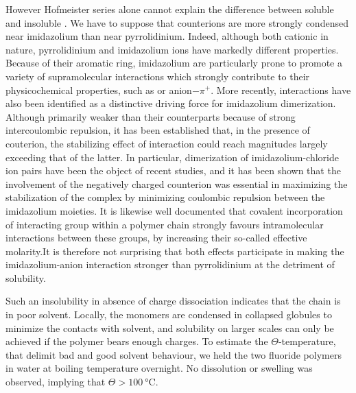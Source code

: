 \documentclass[journal=jacsat,manuscript=article]{achemso}
\begin{document}
However Hofmeister series alone cannot explain the difference between soluble  and insoluble . We have to suppose that counterions are more strongly condensed near imidazolium than near pyrrolidinium. Indeed, although both cationic in nature, pyrrolidinium and imidazolium ions have markedly different properties. Because of their aromatic ring, imidazolium are particularly prone to promote a variety of supramolecular interactions which strongly contribute to their physicochemical properties, such as \ce{\pi+-\pi} or anion$-\pi^+$.  More recently, \ce{\pi+-\pi+} interactions have also been identified as a distinctive driving force for imidazolium dimerization\cite{Geronimo2011}. Although primarily weaker than their \ce{\pi-\pi} counterparts because of strong intercoulombic repulsion, it has been established that, in the presence of couterion, the stabilizing effect of \ce{\pi+-\pi+} interaction could reach magnitudes largely exceeding that of the latter\cite{Geronimo2011}. In particular, dimerization of imidazolium-chloride ion pairs have been the object of recent studies, and it has been shown that the involvement of the negatively charged counterion was essential in maximizing the stabilization of the \ce{\pi+-\pi+} complex by minimizing coulombic repulsion between the imidazolium moieties\cite{Matthews2014,Gao2015a}. It is likewise well documented that covalent incorporation of interacting group within a polymer chain strongly favours intramolecular interactions between these groups, by increasing their so-called effective molarity\cite{Li2003,Mulder2004,Huerta2013}.It is therefore not surprising that both effects participate in making the imidazolium-anion interaction stronger than pyrrolidinium at the detriment of solubility.

Such an insolubility in absence of charge dissociation indicates that the chain is in poor solvent. Locally, the monomers are condensed in collapsed globules to minimize the contacts with solvent, and solubility on larger scales can only be achieved if the polymer bears enough charges\cite{Khokhlov1980,Raphael1990}. To estimate the $\Theta$-temperature, that delimit bad and good solvent behaviour, we held the two fluoride polymers in water at boiling temperature overnight. No dissolution or swelling was observed, implying that $\Theta>\SI{100}{\celsius}$. %


\end{document}
